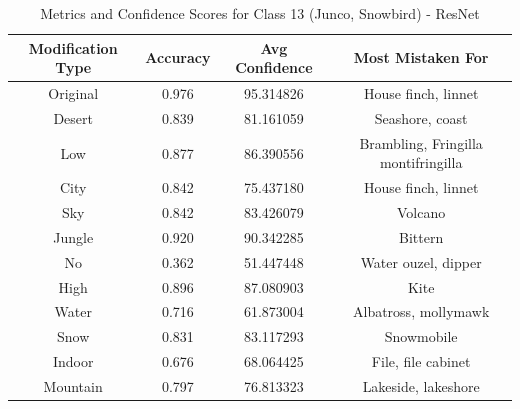 \begin{table}
	\centering
	\begin{tabular}{|c|c|c|c|}
		\hline
		\textbf{Modification Type} & \textbf{Accuracy} & \textbf{Avg Confidence} & \textbf{Most Mistaken For} \\
		\hline
		Original & 0.976 & 95.314826 & House finch, linnet \\
		\hline
		Desert & 0.839 & 81.161059 & Seashore, coast \\
		\hline
		Low & 0.877 & 86.390556 & Brambling, Fringilla montifringilla \\
		\hline
		City & 0.842 & 75.437180 & House finch, linnet \\
		\hline
		Sky & 0.842 & 83.426079 & Volcano \\
		\hline
		Jungle & 0.920 & 90.342285 & Bittern \\
		\hline
		No & 0.362 & 51.447448 & Water ouzel, dipper \\
		\hline
		High & 0.896 & 87.080903 & Kite \\
		\hline
		Water & 0.716 & 61.873004 & Albatross, mollymawk \\
		\hline
		Snow & 0.831 & 83.117293 & Snowmobile \\
		\hline
		Indoor & 0.676 & 68.064425 & File, file cabinet \\
		\hline
		Mountain & 0.797 & 76.813323 & Lakeside, lakeshore \\
		\hline
	\end{tabular}
	\caption{Metrics and Confidence Scores for Class 13 (Junco, Snowbird) - ResNet}
	\label{tab:metrics_confidence_class_13_resnet}
\end{table}

